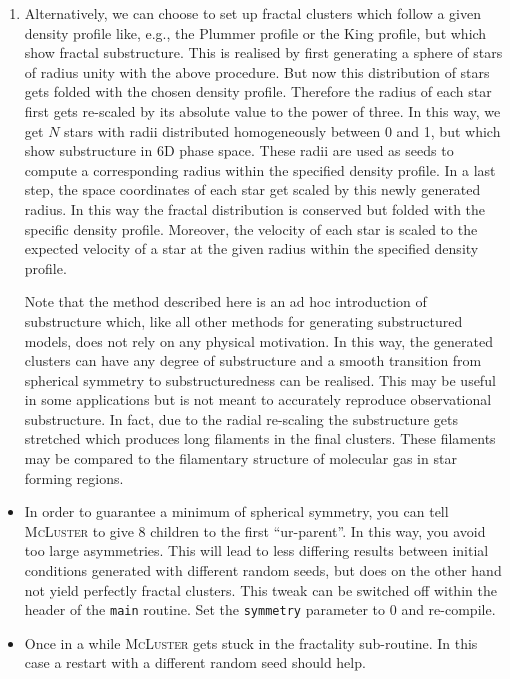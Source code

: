 \documentclass[useAMS,usenatbib]{mn2e}
\begin{document}
\begin{enumerate}
\item Alternatively, we can choose to set up fractal clusters which follow a given density profile like, e.g., the Plummer profile or the King profile, but which show fractal substructure. This is realised by first generating a sphere of stars of radius unity with the above procedure. But now this distribution of stars gets folded with the chosen density profile. Therefore the radius of each star first gets re-scaled by its absolute value to the power of three. In this way, we get $N$ stars with radii distributed homogeneously between 0 and 1, but which show substructure in 6D phase space. These radii are used as seeds to compute a corresponding radius within the specified density profile. In a last step, the space coordinates of each star get scaled by this newly generated radius. In this way the fractal distribution is conserved but folded with the specific density profile. Moreover, the velocity of each star is scaled to the expected velocity of a star at the given radius within the specified density profile. 

Note that the method described here is an ad hoc introduction of substructure which, like all other methods for generating substructured models, does not rely on any physical motivation. In this way, the generated clusters can have any degree of substructure and a smooth transition from spherical symmetry to substructuredness can be realised. This may be useful in some applications but is not meant to accurately reproduce observational substructure. In fact, due to the radial re-scaling the substructure gets stretched which produces long filaments in the final clusters. These filaments may be compared to the filamentary structure of molecular gas in star forming regions.
\end{enumerate}
\begin{itemize}
\item In order to guarantee a minimum of spherical symmetry, you can tell \textsc{McLuster} to give 8 children to the first ``ur-parent''. In this way, you avoid too large asymmetries. This will lead to less differing results between initial conditions generated with different random seeds, but does on the other hand not yield perfectly fractal clusters. This tweak can be switched off within the header of the \texttt{main} routine. Set the \texttt{symmetry} parameter to 0 and re-compile. 
\item Once in a while \textsc{McLuster} gets stuck in the fractality sub-routine. In this case a restart with a different random seed should help.
\end{itemize}
\end{document}
